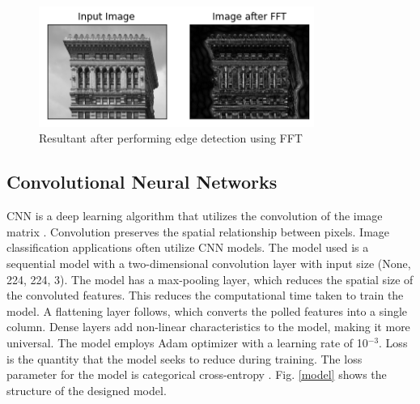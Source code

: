 \documentclass[conference]{IEEEtran}
\begin{document}
\begin{figure}[htpb]
\centerline{\includegraphics[width = 9cm]{fft.png}}
\caption{Resultant after performing edge detection using FFT}
\label{fft}
\end{figure}

\subsection{Convolutional Neural Networks}
CNN is a deep learning algorithm that utilizes the convolution of the image matrix \cite{b11}. Convolution preserves the spatial relationship between pixels. Image classification applications often utilize CNN models. The model used is a sequential model with a two-dimensional convolution layer with input size (None, 224, 224, 3).  The model has a max-pooling layer, which reduces the spatial size of the convoluted features. This reduces the computational time taken to train the model. A flattening layer follows, which converts the polled features into a single column. Dense layers add non-linear characteristics to the model, making it more universal. The model employs Adam optimizer \cite{b9} with a learning rate of 10$^{-3}$. Loss is the quantity that the model seeks to reduce during training. The loss parameter for the model is categorical cross-entropy \cite{b13}. Fig. \ref{model} shows the structure of the designed model.
\end{document}
